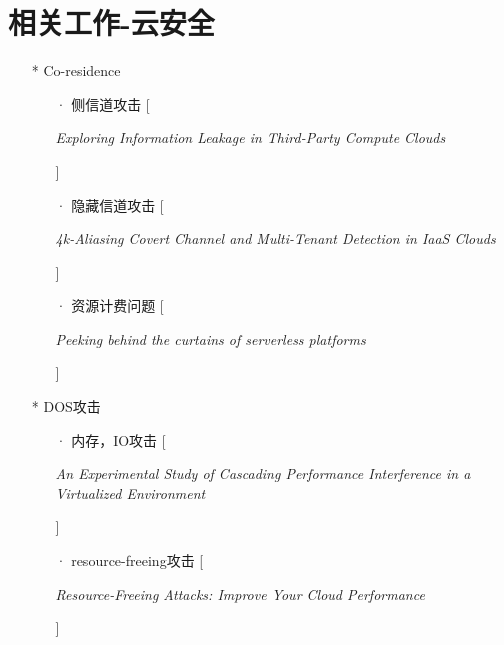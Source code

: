 \documentclass[UTF8]{ctexart}
\begin{document}
	\section{相关工作-云安全}\label{sec:diqijie}
	\begin{itemize}
	\item[*] Co-residence	
		\begin{itemize}
		\item[·] 侧信道攻击 [\begin{upshape} \itshape Exploring Information Leakage in Third-Party Compute Clouds \end{upshape}]
		\item[·] 隐藏信道攻击 [\begin{upshape} \itshape 4k-Aliasing Covert Channel and Multi-Tenant Detection in IaaS Clouds \end{upshape}]
		\item[·] 资源计费问题 [\begin{upshape} \itshape Peeking behind the curtains of serverless platforms\end{upshape}]
		\end{itemize}
	\item[*] DOS攻击
		\begin{itemize}
		\item[·] 内存，IO攻击 [\begin{upshape} \itshape An Experimental Study of Cascading Performance Interference in a Virtualized Environment \end{upshape}]
		\item[·] resource-freeing攻击 [\begin{upshape} \itshape Resource-Freeing Attacks: Improve Your Cloud Performance  \end{upshape}]
		\end{itemize}
	\end{itemize}
	\clearpage
	
	
\end{document}
